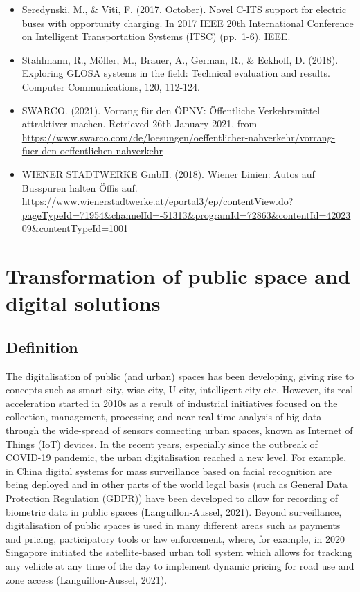 \documentclass[
]{book}
\begin{document}
\begin{itemize}
\item
  Seredynski, M., \& Viti, F. (2017, October). Novel C-ITS support for electric buses with opportunity charging. In 2017 IEEE 20th International Conference on Intelligent Transportation Systems (ITSC) (pp.~1-6). IEEE.
\item
  Stahlmann, R., Möller, M., Brauer, A., German, R., \& Eckhoff, D. (2018). Exploring GLOSA systems in the field: Technical evaluation and results. Computer Communications, 120, 112-124.
\item
  SWARCO. (2021). Vorrang für den ÖPNV: Öffentliche Verkehrsmittel attraktiver machen. Retrieved 26th January 2021, from \url{https://www.swarco.com/de/loesungen/oeffentlicher-nahverkehr/vorrang-fuer-den-oeffentlichen-nahverkehr}
\item
  WIENER STADTWERKE GmbH. (2018). Wiener Linien: Autos auf Busspuren halten Öffis auf. \url{https://www.wienerstadtwerke.at/eportal3/ep/contentView.do?pageTypeId=71954\&channelId=-51313\&programId=72863\&contentId=4202309\&contentTypeId=1001}
\end{itemize}

\hypertarget{transformation_public_space}{%
\section{Transformation of public space and digital solutions}\label{transformation_public_space}}

\hypertarget{definition-5}{%
\subsection*{Definition}\label{definition-5}}

The digitalisation of public (and urban) spaces has been developing, giving rise to concepts such as smart city, wise city, U-city, intelligent city etc. However, its real acceleration started in 2010s as a result of industrial initiatives focused on the collection, management, processing and near real-time analysis of big data through the wide-spread of sensors connecting urban spaces, known as Internet of Things (IoT) devices. In the recent years, especially since the outbreak of COVID-19 pandemic, the urban digitalisation reached a new level. For example, in China digital systems for mass surveillance based on facial recognition are being deployed and in other parts of the world legal basis (such as General Data Protection Regulation (GDPR)) have been developed to allow for recording of biometric data in public spaces (Languillon-Aussel, 2021). Beyond surveillance, digitalisation of public spaces is used in many different areas such as payments and pricing, participatory tools or law enforcement, where, for example, in 2020 Singapore initiated the satellite-based urban toll system which allows for tracking any vehicle at any time of the day to implement dynamic pricing for road use and zone access (Languillon-Aussel, 2021).
\end{document}
